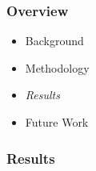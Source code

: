 \begin{frame}
\frametitle{Overview}
    \begin{itemize}
        \item Background
        \item Methodology 
        \item \emph{\color{UOYellow}Results}
        \item Future Work
    \end{itemize}
\end{frame}

\begin{frame}
\frametitle{Results}
\end{frame}
